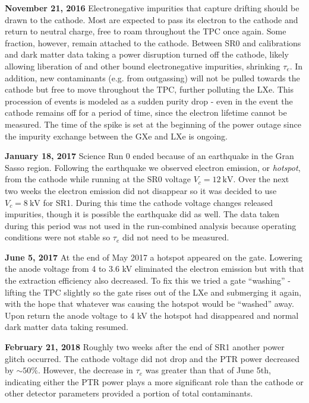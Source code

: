 {\textbf{November 21, 2016}  Electronegative impurities that capture drifting \electron should be drawn to the cathode.  Most are
expected to pass its electron to the cathode and return to neutral charge, free to roam throughout the TPC once again.  Some fraction,
however, remain attached to the cathode.  Between SR0 \ambe and \metakr calibrations and dark matter data taking a power disruption
turned off the cathode, likely allowing liberation of  and other bound electronegative impurities, shrinking
$\tau_e$.  In addition, new contaminants (e.g. from outgassing) will not be pulled towards the cathode but free to move throughout the TPC,
further polluting the LXe.  This procession of events is modeled as a sudden purity drop - even in the event the cathode remains off for a
period of time, since the electron lifetime cannot be measured.  The time of the spike is set at the beginning of the power outage since
the impurity exchange between the GXe and LXe is ongoing.

\textbf{January 18, 2017} Science Run 0 ended because of an earthquake in the Gran Sasso region.  Following the earthquake we observed
electron emission, or \textit{hotspot}, from the cathode while running at the SR0 voltage $V_c = 12\ \mathrm{kV}$.  Over the next two
weeks the electron emission did
not disappear so it was decided to use $V_c = 8\ \mathrm{kV}$ for SR1.  During this time the cathode voltage changes released impurities,
though it is possible the earthquake did as well.  The data taken during this period was not used in the run-combined analysis because
operating conditions were not stable so $\tau_e$ did not need to be measured.

\textbf{June 5, 2017}  At the end of May 2017 a hotspot appeared on the gate.  Lowering the anode voltage from 4 to 3.6 kV eliminated the
electron emission but with that the extraction efficiency also decreased.  To fix this we tried a gate ``washing'' - lifting the TPC
slightly so the gate rises out of the LXe and submerging it again, with the hope that whatever was causing the hotspot would be ``washed''
away.  Upon return the anode voltage to 4 kV the hotspot had disappeared and normal dark matter data taking resumed.

\textbf{February 21, 2018}  Roughly two weeks after the end of SR1 another power glitch occurred.  The cathode voltage did not drop and
the PTR power decreased by ${\sim} 50\%$.  However, the decrease in $\tau_e$ was greater than that of June 5th, indicating either the PTR
power plays a more significant role than the cathode or other detector parameters provided a portion of total contaminants.

}
